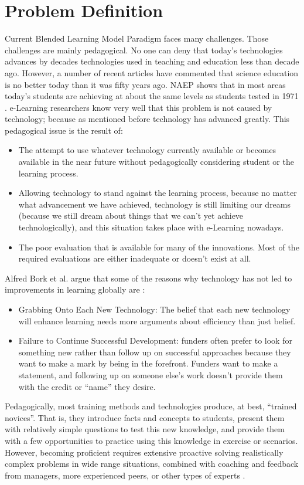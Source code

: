 \documentclass[12pt,a4paper,final,twoside,onecolumn,titlepage]{book}
\begin{document}
\section{Problem Definition}
Current Blended Learning Model Paradigm faces many challenges. Those challenges are mainly pedagogical. No one can deny that today’s technologies advances by decades technologies used in teaching and education less than decade ago. However, a number of recent articles have commented that science education is no better today than it was fifty years ago. \gls{NAEP} shows that in most areas today’s students are achieving at about the same levels as students tested in 1971 \cite{R07}. e-Learning researchers know very well that this problem is not caused by technology; because as mentioned before technology has advanced greatly. This pedagogical issue is the result of:
\begin{itemize}
\item The attempt to use whatever technology currently available or becomes available in the near future without pedagogically considering student or the learning process.
\item Allowing technology to stand against the learning process, because no matter what advancement we have achieved, technology is still limiting our dreams (because we still dream about things that we can’t yet achieve technologically), and this situation takes place with e-Learning nowadays.
\item The poor evaluation that is available for many of the innovations. Most of the required evaluations are either inadequate or doesn’t exist at all.
\end{itemize}
Alfred Bork et al. argue that some of the reasons why technology has not led to improvements in learning globally are \cite{R07}:
\begin{itemize}
\item Grabbing Onto Each New Technology: The belief that each new technology will enhance learning needs more arguments about efficiency than just belief.
\item Failure to Continue Successful Development: funders often prefer to look for something new rather than follow up on successful approaches because they want to make a mark by being in the forefront. Funders want to make a statement, and following up on someone else’s work doesn’t provide them with the credit or “name” they desire.
\end{itemize}
Pedagogically, most training methods and technologies produce, at best, “trained novices”. That is, they introduce facts and concepts to students, present them with relatively simple questions to test this new knowledge, and provide them with a few opportunities to practice using this knowledge in exercise or scenarios. However, becoming proficient requires extensive proactive solving realistically complex problems in wide range situations, combined with coaching and feedback from managers, more experienced peers, or other types of experts \cite{R08}.
\end{document}

